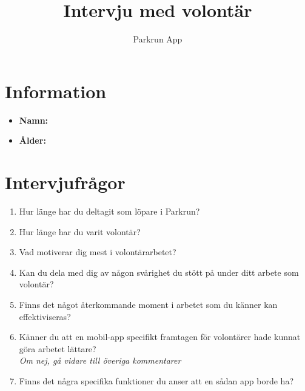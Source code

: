 \documentclass{article}
\title{\textbf{Intervju med volontär}}
\author{Parkrun App}
\date{}
\begin{document}
\maketitle
\thispagestyle{empty}
\section*{Information}
\begin{itemize}[label=]
    \item \textbf{Namn:} 
    \item \textbf{Ålder:} 
\end{itemize}

\section*{Intervjufrågor}
\begin{enumerate}[label=\textbf{Fråga \arabic*:}]
    \item Hur länge har du deltagit som löpare i Parkrun?
        \vspace{2cm}
    \item Hur länge har du varit volontär?
        \vspace{2cm}
    \item Vad motiverar dig mest i volontärarbetet?
        \vspace{2cm}
    \item Kan du dela med dig av någon svårighet du stött på under ditt arbete som volontär?
        \vspace{2cm}
    \item Finns det något återkommande moment i arbetet som du känner kan effektiviseras?
        \vspace{2cm}
    \item Känner du att en mobil-app specifikt framtagen för volontärer hade kunnat göra arbetet lättare?\\
    \textit{Om nej, gå vidare till överiga kommentarer}
        \vspace{2cm}
    \item Finns det några specifika funktioner du anser att en sådan app borde ha?
        \vspace{2cm}
\end{enumerate}
\end{document}
